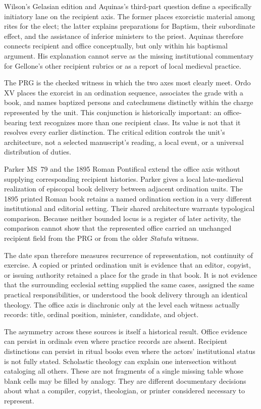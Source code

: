 Wilson's Gelasian edition and Aquinas's third-part question define a
specifically initiatory lane on the recipient axis. The former places
exorcistic material among rites for the elect; the latter explains
preparations for Baptism, their subordinate effect, and the assistance of
inferior ministers to the priest. Aquinas therefore connects recipient and
office conceptually, but only within his baptismal argument. His explanation
cannot serve as the missing institutional commentary for Gellone's other
recipient rubrics or as a report of local medieval practice.

The PRG is the checked witness in which the two axes most clearly meet.
Ordo XV places the exorcist in an ordination sequence, associates the grade
with a book, and names baptized persons and catechumens distinctly within the
charge represented by the unit. This conjunction is historically important:
an office-bearing text recognizes more than one recipient class. Its value is
not that it resolves every earlier distinction. The critical edition controls
the unit's architecture, not a selected manuscript's reading, a local event,
or a universal distribution of duties.

Parker MS~79 and the 1895 Roman Pontifical extend the office axis without
supplying corresponding recipient histories. Parker gives a local
late-medieval realization of episcopal book delivery between adjacent
ordination units. The 1895 printed Roman book retains a named ordination
section in a very different institutional and editorial setting. Their shared
architecture warrants typological comparison. Because neither bounded locus
is a register of later activity, the comparison cannot show that the
represented office carried an unchanged recipient field from the PRG or from
the older \emph{Statuta} witness.

The date span therefore measures recurrence of representation, not continuity
of exercise. A copied or printed ordination unit is evidence that an editor,
copyist, or issuing authority retained a place for the grade in that book.
It is not evidence that the surrounding ecclesial setting supplied the same
cases, assigned the same practical responsibilities, or understood the book
delivery through an identical theology. The office axis is diachronic only
at the level each witness actually records: title, ordinal position, minister,
candidate, and object.

The asymmetry across these sources is itself a historical result. Office
evidence can persist in ordinals even where practice records are absent.
Recipient distinctions can persist in ritual books even where the actors'
institutional status is not fully stated. Scholastic theology can explain one
intersection without cataloging all others. These are not fragments of a
single missing table whose blank cells may be filled by analogy. They are
different documentary decisions about what a compiler, copyist, theologian,
or printer considered necessary to represent.

